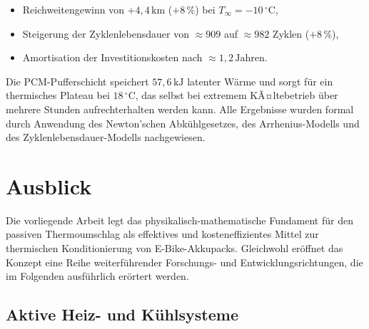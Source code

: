 ﻿\documentclass[a4paper,12pt]{article}
\theoremstyle{definition}
\begin{document}
\begin{itemize}
  \item Reichweitengewinn von $+4{,}4\,\mathrm{km}$ ($+8\,\%$) bei $T_\infty = -10\,{}^\circ\mathrm{C}$,
  \item Steigerung der Zyklenlebensdauer von $\approx 909$ auf $\approx 982$ Zyklen ($+8\,\%$),
  \item Amortisation der Investitionskosten nach $\approx 1{,}2\,\mathrm{Jahren}$.
\end{itemize}

Die PCM-Pufferschicht speichert $57{,}6\,\mathrm{kJ}$ latenter W\"arme und sorgt f\"ur ein thermisches Plateau bei $18\,{}^\circ\mathrm{C}$, das selbst bei extremem KÃ¤ltebetrieb \"uber mehrere Stunden aufrechterhalten werden kann. Alle Ergebnisse wurden formal durch Anwendung des Newton'schen Abk\"uhlgesetzes, des Arrhenius-Modells und des Zyklenlebensdauer-Modells nachgewiesen.

\section{Ausblick}

Die vorliegende Arbeit legt das physikalisch-mathematische Fundament f\"ur den passiven Thermoumschlag als effektives und kosteneffizientes Mittel zur thermischen Konditionierung von E-Bike-Akkupacks. Gleichwohl er\"offnet das Konzept eine Reihe weiterf\"uhrender Forschungs- und Entwicklungsrichtungen, die im Folgenden ausf\"uhrlich er\"ortert werden.

\subsection{Aktive Heiz- und K\"uhlsysteme}
\end{document}
